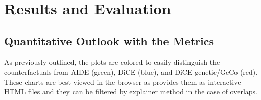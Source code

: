 \chapter{Results and Evaluation\label{chap:evaluation}}
\section{Quantitative Outlook with the Metrics}
As previously outlined, the plots are colored to easily distinguish the counterfactuals from AIDE (green), DiCE (blue), and DiCE-genetic/GeCo (red). These charts are best viewed in the browser as  provides them as interactive HTML files and they can be filtered by explainer method in the case of overlaps.


\begin{figure}[!htbp]
    \centering

\end{figure}
